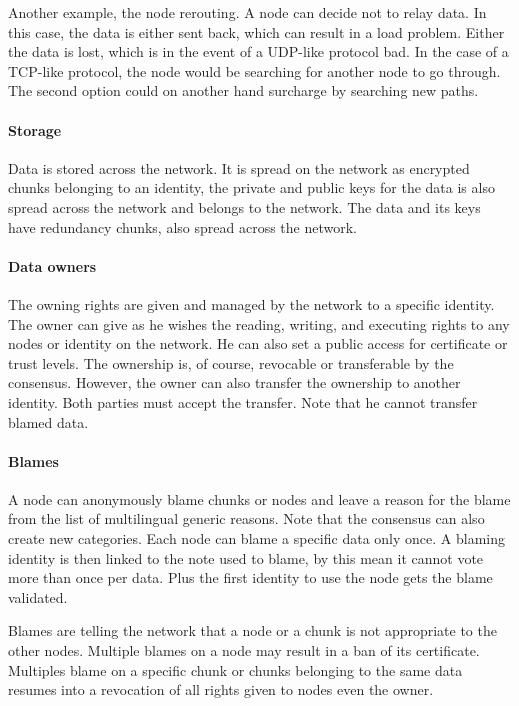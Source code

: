 Another example, the node rerouting. A node can decide not to relay data. In this case, the data is either sent back, which can result in a load problem. Either the data is lost, which is in the event of a UDP-like protocol bad. In the case of a TCP-like protocol, the node would be searching for another node to go through. The second option could on another hand surcharge by searching new paths.

\paragraph{Storage} Data is stored across the network. It is spread on the network as encrypted chunks belonging to an identity, the private and public keys for the data is also spread across the network and belongs to the network. The data and its keys have redundancy chunks, also spread across the network.

\paragraph{Data owners} The owning rights are given and managed by the network to a specific identity. The owner can give as he wishes the reading, writing, and executing rights to any nodes or identity on the network. He can also set a public access for certificate or trust levels. The ownership is, of course, revocable or transferable by the consensus. However, the owner can also transfer the ownership to another identity. Both parties must accept the transfer. Note that he cannot transfer blamed data.

\paragraph{Blames} A node can anonymously blame chunks or nodes and leave a reason for the blame from the list of multilingual generic reasons. Note that the consensus can also create new categories. Each node can blame a specific data only once. A blaming identity is then linked to the note used to blame, by this mean it cannot vote more than once per data. Plus the first identity to use the node gets the blame validated.

Blames are telling the network that a node or a chunk is not appropriate to the other nodes. Multiple blames on a node may result in a ban of its certificate. Multiples blame on a specific chunk or chunks belonging to the same data resumes into a revocation of all rights given to nodes even the owner.

